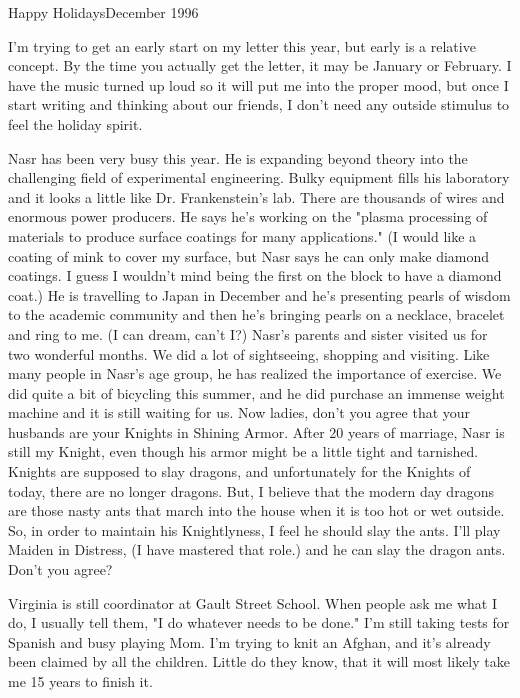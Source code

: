 
%

Happy Holidays\hfill December 1996

I'm trying to get an early start on my letter this year, but early is a relative concept. By the time you actually get the letter, it may be
January or February. I have the music turned up loud so it will put me into the proper mood, but once I start writing and thinking about our
friends, I don't need any outside stimulus to feel the holiday spirit.

Nasr has been very busy this year. He is expanding beyond theory into the challenging field of experimental engineering. Bulky equipment fills
his laboratory and it looks a little like Dr. Frankenstein's lab. There are thousands of wires and enormous power producers. He says he's
working on the "plasma processing of materials to produce surface coatings for many applications." (I would like a coating of mink to cover my
surface, but Nasr says he can only make diamond coatings. I guess I wouldn't mind being the first on the block to have a diamond coat.) He is
travelling to Japan in December and he's presenting pearls of wisdom to the academic community and then he's bringing pearls on a necklace,
bracelet and ring to me. (I can dream, can't I?) Nasr's parents and sister visited us for two wonderful months. We did a lot of sightseeing,
shopping and visiting. Like many people in Nasr's age group, he has realized the importance of exercise. We did quite a bit of bicycling this
summer, and he did purchase an immense weight machine and it is still waiting for us. Now ladies, don't you agree that your husbands are your
Knights in Shining Armor. After 20 years of marriage, Nasr is still my Knight, even though his armor might be a little tight and tarnished.
Knights are supposed to slay dragons, and unfortunately for the Knights of today, there are no longer dragons. But, I believe that the modern
day dragons are those nasty ants that march into the house when it is too hot or wet outside. So, in order to maintain his Knightlyness, I feel
he should slay the ants. I'll play Maiden in Distress, (I have mastered that role.) and he can slay the dragon ants. Don't you agree?

Virginia is still coordinator at Gault Street School. When people ask me what I do, I usually tell them, "I do whatever needs to be done." I'm
still taking tests for Spanish and busy playing Mom. I'm trying to knit an Afghan, and it's already been claimed by all the children. Little do
they know, that it will most likely take me 15 years to finish it.

